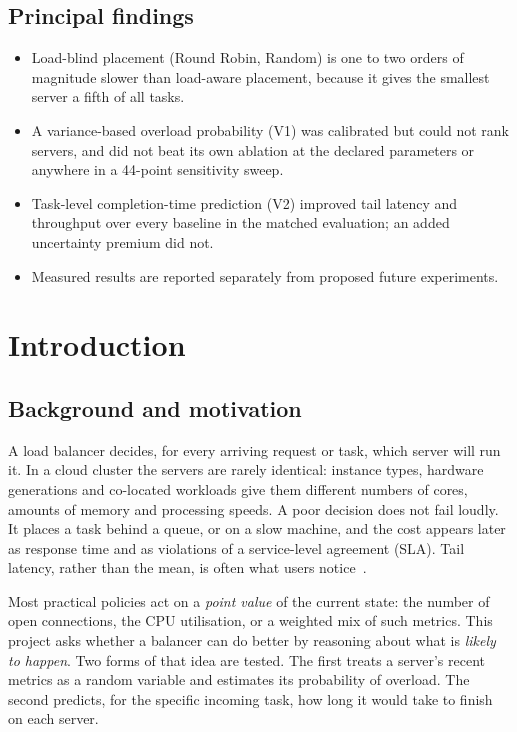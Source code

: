 \documentclass[11pt,a4paper]{article}
\begin{document}
\subsection*{Principal findings}
\begin{itemize}
  \item Load-blind placement (Round Robin, Random) is one to two orders of magnitude slower than load-aware
        placement, because it gives the smallest server a fifth of all tasks.
  \item A variance-based overload probability (V1) was calibrated but could not rank servers, and did not beat
        its own ablation at the declared parameters or anywhere in a 44-point sensitivity sweep.
  \item Task-level completion-time prediction (V2) improved tail latency and throughput over every baseline in the
        matched evaluation; an added uncertainty premium did not.
  \item Measured results are reported separately from proposed future experiments.
\end{itemize}

\clearpage
\tableofcontents
\clearpage

\section{Introduction}

\subsection{Background and motivation}
A load balancer decides, for every arriving request or task, which server will run it. In a cloud
cluster the servers are rarely identical: instance types, hardware generations and co-located workloads
give them different numbers of cores, amounts of memory and processing speeds. A poor decision does not
fail loudly. It places a task behind a queue, or on a slow machine, and the cost appears later as response
time and as violations of a service-level agreement (SLA). Tail latency, rather than the mean, is often
what users notice~\cite{dean2013}.

Most practical policies act on a \emph{point value} of the current state: the number of open connections,
the CPU utilisation, or a weighted mix of such metrics. This project asks whether a balancer can do better
by reasoning about what is \emph{likely to happen}. Two forms of that idea are tested. The first treats a
server's recent metrics as a random variable and estimates its probability of overload. The second
predicts, for the specific incoming task, how long it would take to finish on each server.
\end{document}
